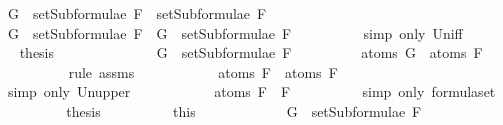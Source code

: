 \begin{isabellebody}
\ {\isachardoublequoteopen}G\ {\isasymin}\ setSubformulae\ F{}\ {\isasymunion}\ setSubformulae\ F{}{\isachardoublequoteclose}\isanewline
\ \ \ \ \isamarkupfalse%
\ \isamarkupfalse%
\ {\isachardoublequoteopen}G\ {\isasymin}\ setSubformulae\ F{}\ {\isasymor}\ G\ {\isasymin}\ setSubformulae\ F{}{\isachardoublequoteclose}\ \ \isanewline
\ \ \ \ \ \ \isamarkupfalse%
\ {\isacharparenleft}simp\ only{\isacharcolon}\ Un{\isacharunderscore}iff{\isacharparenright}\isanewline
\ \ \ \ \isamarkupfalse%
\ \isamarkupfalse%
\ {\isacharquery}thesis\isanewline
\ \ \ \ \isamarkupfalse%
\ \isanewline
\ \ \ \ \ \ \isamarkupfalse%
\ {\isachardoublequoteopen}G\ {\isasymin}\ setSubformulae\ F{}{\isachardoublequoteclose}\isanewline
\ \ \ \ \ \ \isamarkupfalse%
\ \isamarkupfalse%
\ {\isachardoublequoteopen}atoms\ G\ {\isasymsubseteq}\ atoms\ F{}{\isachardoublequoteclose}\isanewline
\ \ \ \ \ \ \ \ \isamarkupfalse%
\ {\isacharparenleft}rule\ assms{\isacharparenleft}{}{\isacharparenright}{\isacharparenright}\isanewline
\ \ \ \ \ \ \isamarkupfalse%
\ \isamarkupfalse%
\ {\isachardoublequoteopen}{\isasymdots}\ {\isasymsubseteq}\ atoms\ F{}\ {\isasymunion}\ atoms\ F{}{\isachardoublequoteclose}\isanewline
\ \ \ \ \ \ \ \ \isamarkupfalse%
\ {\isacharparenleft}simp\ only{\isacharcolon}\ Un{\isacharunderscore}upper{}{\isacharparenright}\isanewline
\ \ \ \ \ \ \isamarkupfalse%
\ \isamarkupfalse%
\ {\isachardoublequoteopen}{\isasymdots}\ {\isacharequal}\ atoms\ {\isacharparenleft}F{}\ \isactrlbold {\isasymrightarrow}\ F{}{\isacharparenright}{\isachardoublequoteclose}\isanewline
\ \ \ \ \ \ \ \ \isamarkupfalse%
\ {\isacharparenleft}simp\ only{\isacharcolon}\ formula{\isachardot}set{\isacharparenleft}{}{\isacharparenright}{\isacharparenright}\isanewline
\ \ \ \ \ \ \isamarkupfalse%
\ \isamarkupfalse%
\ {\isacharquery}thesis\isanewline
\ \ \ \ \ \ \ \ \isamarkupfalse%
\ this\isanewline
\ \ \ \ \isamarkupfalse%
\isanewline
\ \ \ \ \ \ \isamarkupfalse%
\ {\isachardoublequoteopen}G\ {\isasymin}\ setSubformulae\ F{}{\isachardoublequoteclose}\isanewline
\ \ \ \ \ \ \isamarkupfalse%

\end{isabellebody}
